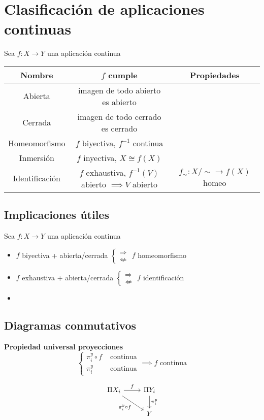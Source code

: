\documentclass{myclass}
\begin{document}
\section{Clasificación de aplicaciones continuas}
Sea $f:X\to Y$ una aplicación continua
\begin{center}
\begin{tabular}{|c|c|c|}
\hline
\textbf{Nombre}  & \textbf{$f$ cumple} & \textbf{Propiedades} \\
\hline
Abierta & imagen de todo abierto es abierto & \\
\hline
Cerrada & imagen de todo cerrado es cerrado & \\
\hline
Homeomorfismo & $f$ biyectiva,  $f^{-1}$ continua & \\
\hline
Inmersión & $f$ inyectiva, $X\cong f(X)$  &   \\
\hline
Identificación & $f$ exhaustiva, $ f^{-1}(V)$ abierto $\implies V$ abierto & $f_\sim : X / \sim \to  f(X)$ homeo \\
\hline

\end{tabular}
\end{center}
\subsection{Implicaciones útiles}
Sea $f:X\to Y$ una aplicación continua
\begin{itemize}[topsep=-6pt, itemsep=0pt]
  \item $f$ biyectiva + abierta/cerrada $\begin{cases}
    \Rightarrow \\ \not\Leftarrow
  \end{cases}$ $f$ homeomorfismo
  \item $f$ exhaustiva + abierta/cerrada  $\begin{cases} \Rightarrow \\ \not\Leftarrow \end{cases}$ $f$ identificación
  \item 
\end{itemize}

\subsection{Diagramas conmutativos}
\begin{minipage}{0.7\textwidth}
\textbf{Propiedad universal proyecciones}
\[
\begin{cases}
  \pi^y_i\circ f & \text{ continua} \\
  \pi^y_i & \text{ continua}
\end{cases}
\implies f \text{ continua}
\] 
\end{minipage}
\begin{minipage}{0.3\textwidth}
\[\begin{tikzcd}
	{\Pi X_i} & {\Pi Y_i} \\
	& Y
	\arrow["f", from=1-1, to=1-2]
	\arrow["{\pi^y_i}", from=1-2, to=2-2]
	\arrow["{\pi^y_i\circ f}"', from=1-1, to=2-2]
\end{tikzcd}\]
\end{minipage}
\end{document}
